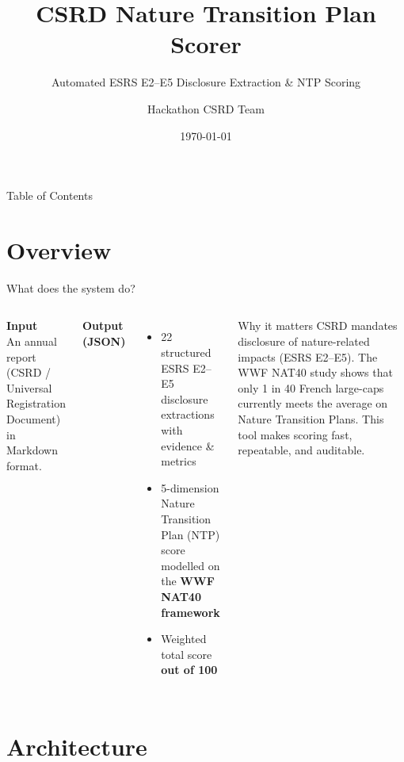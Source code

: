 \documentclass[aspectratio=169]{beamer}
\title[CSRD Nature Scoring]{CSRD Nature Transition Plan Scorer}
\subtitle{Automated ESRS E2--E5 Disclosure Extraction \& NTP Scoring}
\author{Hackathon CSRD Team}
\date{\today}
\institute{Powered by Azure OpenAI $\cdot$ WWF NAT40 Framework}
\begin{document}

\begin{frame}
  \titlepage
\end{frame}

\begin{frame}{Table of Contents}
  \tableofcontents
\end{frame}

\section{Overview}

\begin{frame}{What does the system do?}
  \begin{columns}
      \textbf{Input}\\[4pt]
      An annual report (CSRD / Universal Registration Document) in Markdown format.

      \vspace{10pt}
      \textbf{Output (JSON)}
      \begin{itemize}
        \item 22 structured ESRS E2--E5 disclosure extractions with evidence \& metrics
        \item 5-dimension Nature Transition Plan (NTP) score modelled on the \textbf{WWF NAT40 framework}
        \item Weighted total score \textbf{out of 100}
      \end{itemize}

      \begin{block}{Why it matters}
        CSRD mandates disclosure of nature-related impacts (ESRS E2--E5). The WWF NAT40 study
        shows that only 1 in 40 French large-caps currently meets the average on Nature
        Transition Plans. This tool makes scoring fast, repeatable, and auditable.
      \end{block}
  \end{columns}
\end{frame}

\section{Architecture}
\end{document}
